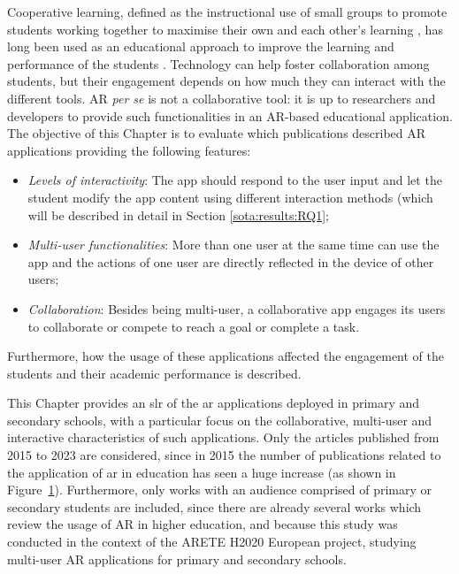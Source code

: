 Cooperative learning, defined as the instructional use of small groups to promote students working together to maximise their own and each other's learning \citep{johnson1991cooperation}, has long been used as an educational approach to improve the learning and performance of the students \citep{johnson2008active, kuh2011piecing}. Technology can help foster collaboration among students, but their engagement depends on how much they can interact with the different tools. AR \textit{per se} is not a collaborative tool: it is up to researchers and developers to provide such functionalities in an AR-based educational application. The objective of this Chapter is to evaluate which publications described AR applications providing the following features:
\begin{itemize}
    \item \emph{Levels of interactivity}: The app should respond to the user input and let the student modify the app content using different interaction methods (which will be described in detail in Section \ref{sota:results:RQ1};
    \item \emph{Multi-user functionalities}: More than one user at the same time can use the app and the actions of one user are directly reflected in the device of other users;
    \item \emph{Collaboration}: Besides being multi-user, a collaborative app engages its users to collaborate or compete to reach a goal or complete a task.
\end{itemize}
Furthermore, how the usage of these applications affected the engagement of the students and their academic performance is described. 

This Chapter provides an \gls{slr} of the \gls{ar} applications deployed in primary and secondary schools, with a particular focus on the collaborative, multi-user and interactive characteristics of such applications. Only the articles published from 2015 to 2023 are considered, since in 2015 the number of publications related to the application of \gls{ar} in education has seen a huge increase (as shown in Figure~\ref{fig:pappublbg}). Furthermore, only works with an audience comprised of primary or secondary students are included, since there are already several works which review the usage of AR in higher education, and because this study was conducted in the context of the ARETE H2020 European project, studying multi-user AR applications for primary and secondary schools.

\begin{figure}[htbp]
	\begin{center}
	
	\captionsetup{font=small}
	\caption{\fontsize{10pt}{11pt}}
	\label{fig:pappublbg}
    \end{center}
\end{figure}

